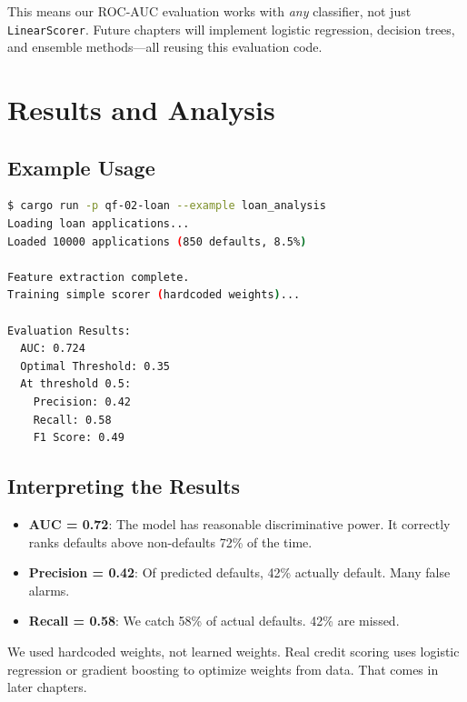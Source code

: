 
This means our ROC-AUC evaluation works with \emph{any} classifier, not just
\texttt{LinearScorer}. Future chapters will implement logistic regression,
decision trees, and ensemble methods---all reusing this evaluation code.

\section{Results and Analysis}

\subsection{Example Usage}

\begin{lstlisting}[language=bash]
$ cargo run -p qf-02-loan --example loan_analysis
Loading loan applications...
Loaded 10000 applications (850 defaults, 8.5%)

Feature extraction complete.
Training simple scorer (hardcoded weights)...

Evaluation Results:
  AUC: 0.724
  Optimal Threshold: 0.35
  At threshold 0.5:
    Precision: 0.42
    Recall: 0.58
    F1 Score: 0.49
\end{lstlisting}

\subsection{Interpreting the Results}

\begin{itemize}
    \item \textbf{AUC = 0.72}: The model has reasonable discriminative power. It correctly ranks defaults above non-defaults 72\% of the time.
    \item \textbf{Precision = 0.42}: Of predicted defaults, 42\% actually default. Many false alarms.
    \item \textbf{Recall = 0.58}: We catch 58\% of actual defaults. 42\% are missed.
\end{itemize}

\begin{warning}
We used hardcoded weights, not learned weights. Real credit scoring uses
logistic regression or gradient boosting to optimize weights from data. That
comes in later chapters.
\end{warning}

